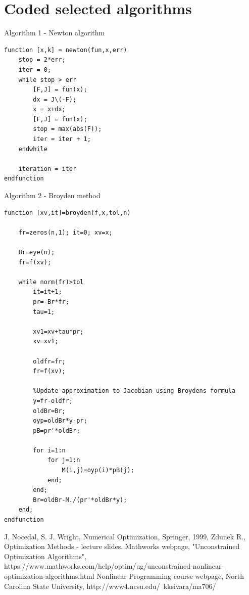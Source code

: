 \documentclass[eng,openany]{mgr}
\begin{document}
\section{Coded selected algorithms}
Algorithm 1 - Newton algorithm\\ 
\begin{lstlisting}
function [x,k] = newton(fun,x,err)
	stop = 2*err;
	iter = 0;
	while stop > err
		[F,J] = fun(x);
		dx = J\(-F);
		x = x+dx;
		[F,J] = fun(x);
		stop = max(abs(F));
		iter = iter + 1;
	endwhile
	
	iteration = iter
endfunction
\end{lstlisting}
\newpage
Algorithm 2 - Broyden method\\
\begin{lstlisting}
function [xv,it]=broyden(f,x,tol,n)
	
	fr=zeros(n,1); it=0; xv=x;
	
	Br=eye(n);
	fr=f(xv);
	
	while norm(fr)>tol
		it=it+1;
		pr=-Br*fr;
		tau=1;
		
		xv1=xv+tau*pr; 
		xv=xv1;
		
		oldfr=fr; 
		fr=f(xv);
		
		%Update approximation to Jacobian using Broydens formula
		y=fr-oldfr; 
		oldBr=Br;
		oyp=oldBr*y-pr; 
		pB=pr'*oldBr;
		
		for i=1:n
			for j=1:n
				M(i,j)=oyp(i)*pB(j);
			end;
		end;
		Br=oldBr-M./(pr'*oldBr*y);
	end;
endfunction
\end{lstlisting}
\begin{thebibliography}{8}
J. Nocedal, S. J. Wright, Numerical Optimization, Springer, 1999,
Zdunek R., Optimization Methods - lecture slides.
Mathworks webpage, "Unconstrained Optimization Algorithms", https://www.mathworks.com/help/optim/ug/unconstrained-nonlinear-optimization-algorithms.html
Nonlinear Programming course webpage, North Carolina State University,
http://www4.ncsu.edu/~kksivara/ma706/
\end{thebibliography}
\end{document}
